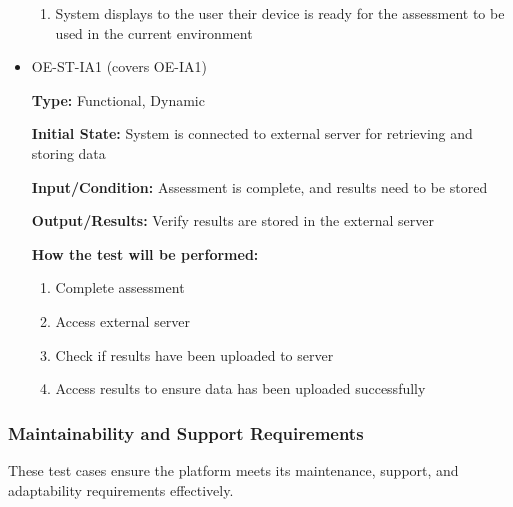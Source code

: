 \documentclass[12pt, titlepage]{article}
\begin{document}
\begin{itemize}
\begin{mdframed}[linewidth=0.5mm]
\begin{enumerate}[noitemsep]
        \item System displays to the user their device is ready for the assessment to be used in the current environment
      \end{enumerate}
  \end{mdframed}
  \item OE-ST-IA1 (covers OE-IA1)
  \begin{mdframed}[linewidth=0.5mm]
      \textbf{Type:} Functional, Dynamic \par
      \textbf{Initial State:} System is connected to external server for retrieving and storing data \par
      \textbf{Input/Condition:} Assessment is complete, and results need to be stored\par
      \textbf{Output/Results:} Verify results are stored in the external server \par
      \textbf{How the test will be performed:}
      \begin{enumerate}[noitemsep]
        \item Complete assessment
        \item Access external server
        \item Check if results have been uploaded to server
        \item Access results to ensure data has been uploaded successfully
      \end{enumerate}
  \end{mdframed}
\end{itemize}

\subsubsection{Maintainability and Support Requirements}

These test cases ensure the platform meets its maintenance, support, and adaptability requirements effectively.
\end{document}
